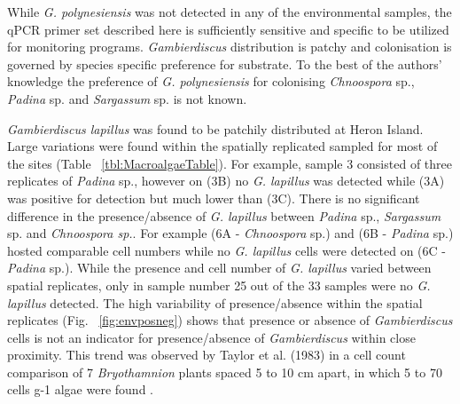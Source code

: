 \documentclass[12pt]{article}
\begin{document}



While \emph{G. polynesiensis} was not detected in any of the environmental samples, the qPCR primer set described here is sufficiently sensitive and specific to be utilized for monitoring programs. \emph{Gambierdiscus} distribution is patchy and colonisation is governed by species specific preference for substrate. To the best of the authors' knowledge the preference of \emph{G. polynesiensis} for colonising \emph{Chnoospora} sp., \emph{Padina} sp. and \emph{Sargassum} sp. is not known. %

\emph{Gambierdiscus lapillus} was found to be patchily distributed at Heron Island. Large variations were found within the spatially replicated sampled for most of the sites (Table ~\ref{tbl:MacroalgaeTable}). For example, sample 3 consisted of three replicates of \emph{Padina} sp., however on (3B) no \emph{G. lapillus} was detected while (3A) was positive for detection but much lower than (3C).
There is no significant difference in the presence/absence of \emph{G. lapillus} between \emph{Padina} sp., \emph{Sargassum} sp. and \emph{Chnoospora sp.}. For example (6A - \emph{Chnoospora} sp.) and (6B - \emph{Padina} sp.) hosted comparable cell numbers while no \emph{G. lapillus} cells were detected on (6C - \emph{Padina} sp.). While the presence and cell number of \emph{G. lapillus} varied between spatial replicates, only in sample number 25 out of the 33 samples were no \emph{G. lapillus} detected. 
The high variability of presence/absence  within the spatial replicates (Fig. ~\ref{fig:envposneg}) shows that presence or absence of \emph{Gambierdiscus} cells is not an indicator for presence/absence of \emph{Gambierdiscus} within close proximity. This trend was observed by Taylor et al. (1983) in a cell count comparison of 7 \emph{Bryothamnion} plants spaced 5 to 10 cm apart, in which 5 to 70 cells g-1 algae were found \cite{taylor1986underwater}. 
\end{document}
